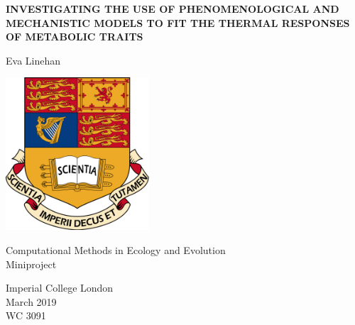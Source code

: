 \documentclass[11pt]{article}
\begin{document}
\begin{titlepage}
		\centering
		
		\vspace{1cm}
		{\uppercase{\textbf{\Large Investigating the use of Phenomenological and Mechanistic Models to Fit the Thermal Responses of Metabolic Traits\\}}}
		\vspace{1cm}
		{\Large Eva Linehan\par}
		\vspace{2cm}
		
		\includegraphics[width=0.4\textwidth]{../Writeup/crest.png}
		
		\vspace{1.7cm}
		
		Computational Methods in Ecology and Evolution\\
		Miniproject
		
		\vspace{0.8cm}
		
		Imperial College London\\
		March 2019\\
		WC 3091
\end{titlepage}


\end{document}
